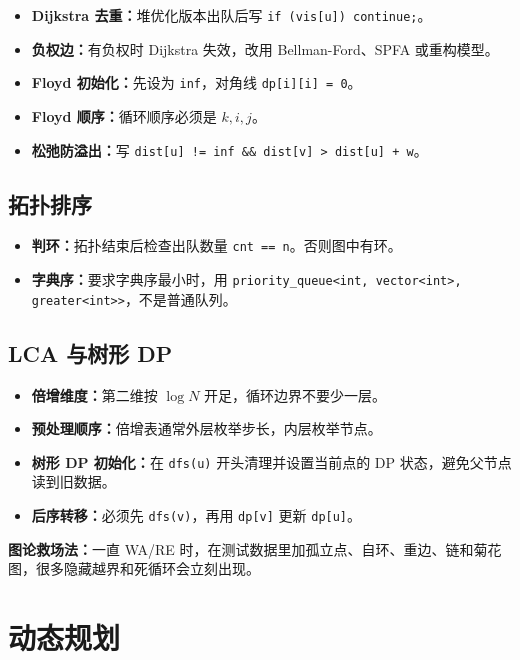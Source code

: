 \documentclass[UTF8,openany,oneside,zihao=-4]{ctexbook}
\newcommand{\note}[1]{%
  \vspace{0.35em}
  \noindent\colorbox{softblue}{%
    \parbox{\dimexpr\linewidth-2\fboxsep}{\textcolor{ink}{#1}}}%
  \vspace{0.35em}
}
\begin{document}
\begin{itemize}
  \item \textbf{Dijkstra 去重：}堆优化版本出队后写 \lstinline!if (vis[u]) continue;!。
  \item \textbf{负权边：}有负权时 Dijkstra 失效，改用 Bellman-Ford、SPFA 或重构模型。
  \item \textbf{Floyd 初始化：}先设为 \lstinline!inf!，对角线 \lstinline!dp[i][i] = 0!。
  \item \textbf{Floyd 顺序：}循环顺序必须是 $k,i,j$。
  \item \textbf{松弛防溢出：}写 \texttt{dist[u] != inf \&\& dist[v] > dist[u] + w}。
\end{itemize}

\subsection{拓扑排序}

\begin{itemize}
  \item \textbf{判环：}拓扑结束后检查出队数量 \lstinline!cnt == n!。否则图中有环。
  \item \textbf{字典序：}要求字典序最小时，用 \lstinline!priority_queue<int, vector<int>, greater<int>>!，不是普通队列。
\end{itemize}

\subsection{LCA 与树形 DP}

\begin{itemize}
  \item \textbf{倍增维度：}第二维按 $\log N$ 开足，循环边界不要少一层。
  \item \textbf{预处理顺序：}倍增表通常外层枚举步长，内层枚举节点。
  \item \textbf{树形 DP 初始化：}在 \lstinline!dfs(u)! 开头清理并设置当前点的 DP 状态，避免父节点读到旧数据。
  \item \textbf{后序转移：}必须先 \lstinline!dfs(v)!，再用 \lstinline!dp[v]! 更新 \lstinline!dp[u]!。
\end{itemize}

\note{\textbf{图论救场法：}一直 WA/RE 时，在测试数据里加孤立点、自环、重边、链和菊花图，很多隐藏越界和死循环会立刻出现。}

\section{动态规划}
\end{document}
